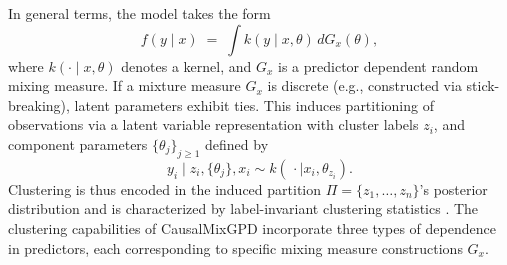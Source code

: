 \documentclass[preprint,12pt,authoryear]{elsarticle}
\newcommand{\pkg}[1]{\textsf{#1}}
\begin{document}
In general terms, the model takes the form
\begin{equation*}
f(y\mid x) \;=\; \int k\!\left(y\mid x,\theta\right)\, dG_x(\theta),
\end{equation*}
where $k(\cdot\mid x,\theta)$ denotes a kernel, and $G_x$ is a predictor dependent random mixing measure. If a mixture measure $G_x$ is discrete (e.g., constructed via stick-breaking), latent parameters exhibit ties. This induces partitioning of observations via a latent variable representation with cluster labels $z_i$, and component parameters $\{\theta_j\}_{j\ge1}$ defined by
\begin{equation*}
y_i \mid z_i,\{\theta_j\},x_i \sim k\!\left(\,\cdot \mid x_i,\theta_{z_i}\right).
\end{equation*}
Clustering is thus encoded in the induced partition $\Pi=\{z_1,\ldots,z_n\}$'s posterior distribution and is characterized by label-invariant clustering statistics \citep{Binder1978,Dahl2006}. The clustering capabilities of \pkg{CausalMixGPD} incorporate three types of dependence in predictors, each corresponding to specific mixing measure constructions $G_x$.
\end{document}
